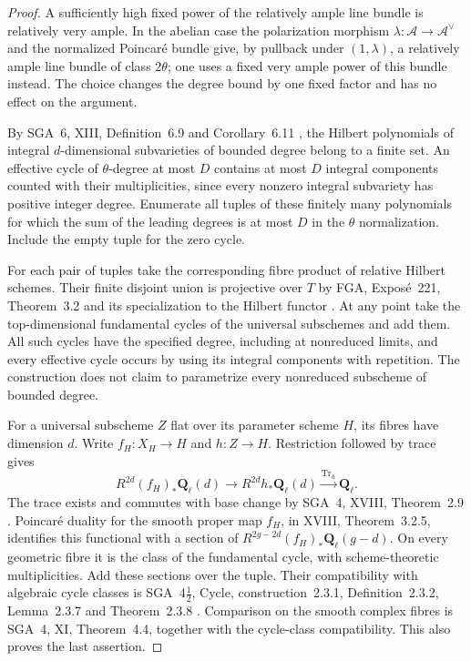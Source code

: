 \documentclass[11pt]{article}
\theoremstyle{definition}
\theoremstyle{remark}
\newcommand{\Q}{\mathbf Q}
\newcommand{\A}{\mathcal A}
\begin{document}
\begin{proof}
A sufficiently high fixed power of the relatively ample line bundle is relatively very ample. In the abelian case the polarization morphism $\lambda:\A\to\A^\vee$ and the normalized Poincar\'e bundle give, by pullback under $(1,\lambda)$, a relatively ample line bundle of class $2\theta$; one uses a fixed very ample power of this bundle instead. The choice changes the degree bound by one fixed factor and has no effect on the argument.

By SGA~6, XIII, Definition~6.9 and Corollary~6.11 \cite{SGA6}, the Hilbert polynomials of integral $d$-dimensional subvarieties of bounded degree belong to a finite set. An effective cycle of $\theta$-degree at most $D$ contains at most $D$ integral components counted with their multiplicities, since every nonzero integral subvariety has positive integer degree. Enumerate all tuples of these finitely many polynomials for which the sum of the leading degrees is at most $D$ in the $\theta$ normalization. Include the empty tuple for the zero cycle.

For each pair of tuples take the corresponding fibre product of relative Hilbert schemes. Their finite disjoint union is projective over $T$ by FGA, Expos\'e~221, Theorem~3.2 and its specialization to the Hilbert functor \cite{FGA}. At any point take the top-dimensional fundamental cycles of the universal subschemes and add them. All such cycles have the specified degree, including at nonreduced limits, and every effective cycle occurs by using its integral components with repetition. The construction does not claim to parametrize every nonreduced subscheme of bounded degree.

For a universal subscheme $Z$ flat over its parameter scheme $H$, its fibres have dimension $d$. Write $f_H:X_H\to H$ and $h:Z\to H$. Restriction followed by trace gives
\[
 R^{2d}(f_H)_*\Q_\ell(d)\longrightarrow
 R^{2d}h_*\Q_\ell(d)\xrightarrow{\operatorname{Tr}_h}\Q_\ell.
\]
The trace exists and commutes with base change by SGA~4, XVIII, Theorem~2.9 \cite{SGA4}. Poincar\'e duality for the smooth proper map $f_H$, in XVIII, Theorem~3.2.5, identifies this functional with a section of $R^{2g-2d}(f_H)_*\Q_\ell(g-d)$. On every geometric fibre it is the class of the fundamental cycle, with scheme-theoretic multiplicities. Add these sections over the tuple. Their compatibility with algebraic cycle classes is SGA~$4\frac12$, Cycle, construction~2.3.1, Definition~2.3.2, Lemma~2.3.7 and Theorem~2.3.8 \cite{SGA45}. Comparison on the smooth complex fibres is SGA~4, XI, Theorem~4.4, together with the cycle-class compatibility. This also proves the last assertion.
\end{proof}
\end{document}
